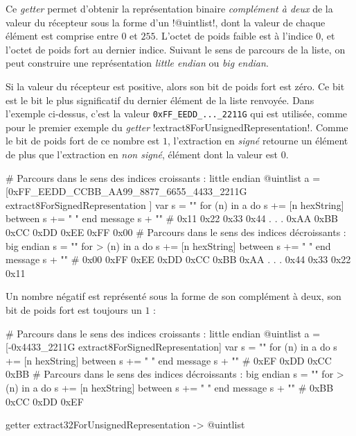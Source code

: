 Ce \emph{getter} permet d'obtenir la représentation binaire \emph{complément à deux} de la valeur du récepteur sous la forme d'un \ggs!@uintlist!, dont la valeur de chaque élément est comprise entre $0$ et $255$. L'octet de poids faible est à l'indice $0$, et l'octet de poids fort au dernier indice. Suivant le sens de parcours de la liste, on peut construire une représentation \emph{little endian} ou \emph{big endian}.

Si la valeur du récepteur est positive, alors son bit de poids fort est zéro. Ce bit est le bit le plus significatif du dernier élément de la liste renvoyée. Dans l'exemple ci-dessus, c'est la valeur \texttt{0xFF\_EEDD\_...\_2211G} qui est utilisée, comme pour le premier exemple du \emph{getter} \ggs!extract8ForUnsignedRepresentation!. Comme le bit de poids fort de ce nombre est $1$, l'extraction en \emph{signé} retourne un élément de plus que l'extraction en \emph{non signé}, élément dont la valeur est $0$.

\begin{galgas}
# Parcours dans le sens des indices croissants : little endian
@uintlist a = [0xFF_EEDD_CCBB_AA99_8877_6655_4433_2211G
  extract8ForSignedRepresentation
]
var s = ""
for (n) in a
  do s += [n hexString]
  between s += " "
end
message s + "\n" # 0x11 0x22 0x33 0x44 . . . 0xAA 0xBB 0xCC 0xDD 0xEE 0xFF 0x00
# Parcours dans le sens des indices décroissants : big endian
s = ""
for > (n) in a
  do s += [n hexString]
  between s += " "
end
message s + "\n" # 0x00 0xFF 0xEE 0xDD 0xCC 0xBB 0xAA . . . 0x44 0x33 0x22 0x11
\end{galgas}

Un nombre négatif est représenté sous la forme de son complément à deux, son bit de poids fort est toujours un $1$ : 

\begin{galgas}
# Parcours dans le sens des indices croissants : little endian
@uintlist a = [-0x4433_2211G extract8ForSignedRepresentation]
var s = ""
for (n) in a
  do s += [n hexString]
  between s += " "
end
message s + "\n" # 0xEF 0xDD 0xCC 0xBB
# Parcours dans le sens des indices décroissants : big endian
s = ""
for > (n) in a
  do s += [n hexString]
  between s += " "
end
message s + "\n" # 0xBB 0xCC 0xDD 0xEF
\end{galgas}


\begin{galgasbox}
getter extract32ForUnsignedRepresentation -> @uintlist
\end{galgasbox}

